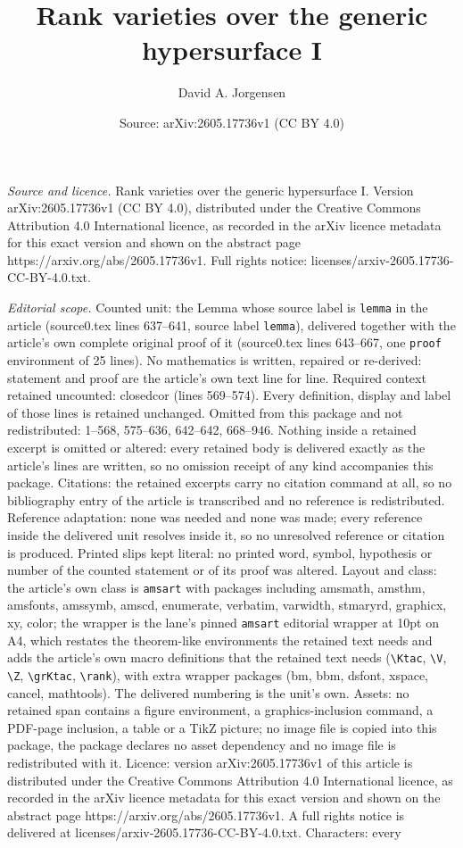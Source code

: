 \documentclass[10pt,a4paper]{amsart}
\title[Rank varieties over the generic hypersurface I]{Rank varieties over the generic hypersurface I}
\author{David A. Jorgensen}
\date{Source: arXiv:2605.17736v1 (CC BY 4.0)}
\begin{document}
\maketitle

\noindent\emph{Source and licence.} Rank varieties over the generic hypersurface I. Version arXiv:2605.17736v1 (CC BY 4.0), distributed under the Creative Commons Attribution 4.0 International licence, as recorded in the arXiv licence metadata for this exact version and shown on the abstract page https://arxiv.org/abs/2605.17736v1. Full rights notice: licenses/arxiv-2605.17736-CC-BY-4.0.txt.\par\smallskip

\noindent\textit{Editorial scope.} Counted unit: the Lemma whose source label is \texttt{lemma} in the article (source0.tex lines 637--641, source label \texttt{lemma}), delivered together with the article's own complete original proof of it (source0.tex lines 643--667, one \texttt{proof} environment of 25 lines). No mathematics is written, repaired or re-derived: statement and proof are the article's own text line for line. Required context retained uncounted: closedcor (lines 569--574). Every definition, display and label of those lines is retained unchanged. Omitted from this package and not redistributed: 1--568, 575--636, 642--642, 668--946. Nothing inside a retained excerpt is omitted or altered: every retained body is delivered exactly as the article's lines are written, so no omission receipt of any kind accompanies this package. Citations: the retained excerpts carry no citation command at all, so no bibliography entry of the article is transcribed and no reference is redistributed. Reference adaptation: none was needed and none was made; every reference inside the delivered unit resolves inside it, so no unresolved reference or citation is produced. Printed slips kept literal: no printed word, symbol, hypothesis or number of the counted statement or of its proof was altered. Layout and class: the article's own class is \texttt{amsart} with packages including amsmath, amsthm, amsfonts, amssymb, amscd, enumerate, verbatim, varwidth, stmaryrd, graphicx, xy, color; the wrapper is the lane's pinned \texttt{amsart} editorial wrapper at 10pt on A4, which restates the theorem-like environments the retained text needs and adds the article's own macro definitions that the retained text needs (\texttt{\textbackslash Ktac}, \texttt{\textbackslash V}, \texttt{\textbackslash Z}, \texttt{\textbackslash grKtac}, \texttt{\textbackslash rank}), with extra wrapper packages (bm, bbm, dsfont, xspace, cancel, mathtools). The delivered numbering is the unit's own. Assets: no retained span contains a figure environment, a graphics-inclusion command, a PDF-page inclusion, a table or a TikZ picture; no image file is copied into this package, the package declares no asset dependency and no image file is redistributed with it. Licence: version arXiv:2605.17736v1 of this article is distributed under the Creative Commons Attribution 4.0 International licence, as recorded in the arXiv licence metadata for this exact version and shown on the abstract page https://arxiv.org/abs/2605.17736v1. A full rights notice is delivered at licenses/arxiv-2605.17736-CC-BY-4.0.txt. Characters: every 
\end{document}
